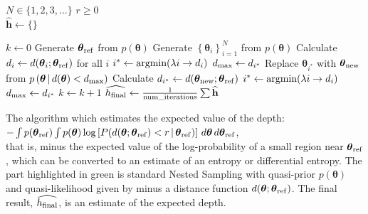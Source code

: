 \documentclass[entropy,article,accept,oneauthor,pdftex,10pt,a4paper]{mdpi}
\newcommand{\revision}{\color{darkblue}}
\newcommand{\x}{\boldsymbol{\theta}}
\newcommand{\xref}{\x_{\rm ref}}
\begin{document}
\begin{algorithm}
\begin{algorithmic}
\State $N \in \{1, 2, 3, ... \}$
\State $r \geq 0$
             \\
\hrulefill
\State $\widehat{\mathbf{h}} \leftarrow \{\}$

    \State $k \leftarrow 0$
    \State Generate $\xref$ from $p(\x)$
\color{green}
    \State Generate $\left\{\x_i\right\}_{i=1}^N$ from $p(\x)$
    \State Calculate $d_i \leftarrow d(\x_i; \xref)$ for all $i$
    \State $i^* \leftarrow \textnormal{argmin}(\lambda i \rightarrow d_i)$
    \State $d_{\rm max} \leftarrow d_{i^*}$
        \State Replace $\x_{i^*}$ with $\x_{\rm new}$ from
               $p\left(\x \,|\, d(\x) < d_{\rm max}\right)$
        \State Calculate $d_{i^*} \leftarrow d(\x_{\rm new}; \xref)$
        \State $i^* \leftarrow \textnormal{argmin}(\lambda i \rightarrow d_i)$
        \State $d_{\rm max} \leftarrow d_{i^*}$
        \State $k \leftarrow k+1$
    \EndWhile
\color{black}
    \State {\revision  $\widehat{\mathbf{h}} \leftarrow \textnormal{append}\big(\widehat{\mathbf{h}}, k/N\big)$ }
\EndWhile
\State $\widehat{h_{\rm final}} \leftarrow \frac{1}{\rm num\_iterations} \sum \widehat{\mathbf{h}}$
\end{algorithmic}
\caption{The algorithm which estimates the expected value of the depth:\\
           \quad\quad$-\int p(\xref) \int p(\x)
            \log \left[ P(d(\x; \xref) < r \,|\, \xref) \right]
                        \, d\x \, d\xref$,\\ that is, minus the expected value of the
        log-probability of a small region near $\xref$, which can be converted
        to an estimate of an entropy or differential entropy.
        The part highlighted in green is standard Nested Sampling
        with quasi-prior $p(\x)$ and quasi-likelihood given by minus a
        distance function $d(\x; \xref)$. The final result, $\widehat{h_{\rm final}}$, is an estimate of the expected depth.
        \label{alg:algorithm}}
\end{algorithm}
\end{document}
